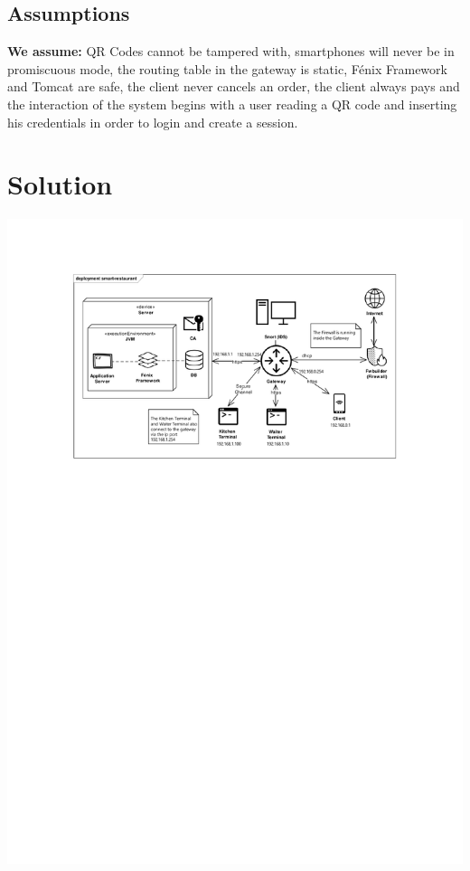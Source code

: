 \documentclass[12pt,paper=a4]{article}
\begin{document}
\subsection{Assumptions}
\textbf{We assume:} QR Codes cannot be tampered with, smartphones will never be in promiscuous mode, the routing table in the gateway is static, Fénix Framework and Tomcat are safe, the client never cancels an order, the client always pays and the interaction of the system begins with a user reading a QR code and inserting his credentials in order to login and create a session.

\section{Solution}

\includegraphics[trim=3.1cm 18cm 0 2cm]{Diagrama.pdf}
\end{document}
